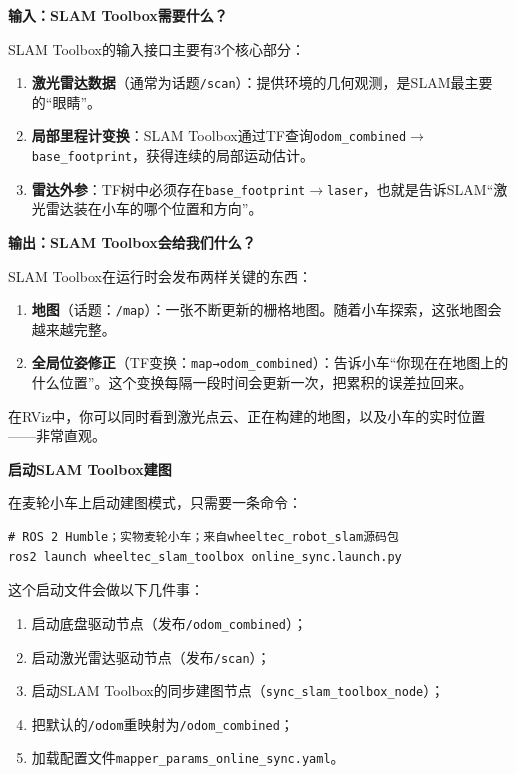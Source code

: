 \documentclass[UTF8,zihao=-4]{ctexart}
\DeclareRobustCommand{\code}[1]{\texttt{#1}}
\begin{document}
\textbf{输入：SLAM Toolbox需要什么？}

SLAM Toolbox的输入接口主要有3个核心部分：

\begin{enumerate}
\item \textbf{激光雷达数据}（通常为话题\code{/scan}）：提供环境的几何观测，是SLAM最主要的“眼睛”。
\item \textbf{局部里程计变换}：SLAM Toolbox通过TF查询\code{odom\_combined}$\rightarrow$\code{base\_footprint}，获得连续的局部运动估计。
\item \textbf{雷达外参}：TF树中必须存在\code{base\_footprint}$\rightarrow$\code{laser}，也就是告诉SLAM“激光雷达装在小车的哪个位置和方向”。
\end{enumerate}


\textbf{输出：SLAM Toolbox会给我们什么？}

SLAM Toolbox在运行时会发布两样关键的东西：

\begin{enumerate}
\item \textbf{地图}（话题：\code{/map}）：一张不断更新的栅格地图。随着小车探索，这张地图会越来越完整。
\item \textbf{全局位姿修正}（TF变换：\code{map→odom\_combined}）：告诉小车“你现在在地图上的什么位置”。这个变换每隔一段时间会更新一次，把累积的误差拉回来。
\end{enumerate}

在RViz中，你可以同时看到激光点云、正在构建的地图，以及小车的实时位置——非常直观。

\textbf{启动SLAM Toolbox建图}

在麦轮小车上启动建图模式，只需要一条命令：

\begin{verbatim}
# ROS 2 Humble；实物麦轮小车；来自wheeltec_robot_slam源码包
ros2 launch wheeltec_slam_toolbox online_sync.launch.py
\end{verbatim}

这个启动文件会做以下几件事：

\begin{enumerate}
\item 启动底盘驱动节点（发布\code{/odom\_combined}）；
\item 启动激光雷达驱动节点（发布\code{/scan}）；
\item 启动SLAM Toolbox的同步建图节点（\code{sync\_slam\_toolbox\_node}）；
\item 把默认的\code{/odom}重映射为\code{/odom\_combined}；
\item 加载配置文件\code{mapper\_params\_online\_sync.yaml}。
\end{enumerate}
\end{document}
